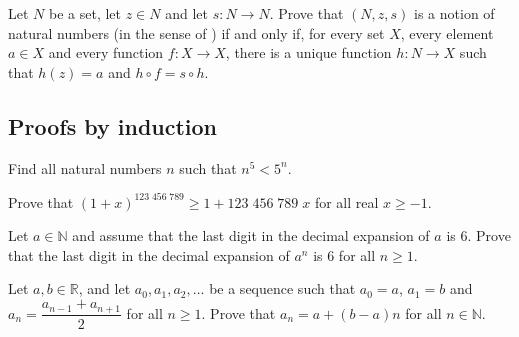 \begin{chapex}
Let $N$ be a set, let $z \in N$ and let $s : N \to N$. Prove that $(N, z, s)$ is a notion of natural numbers (in the sense of ) if and only if, for every set $X$, every element $a \in X$ and every function $f : X \to X$, there is a unique function $h : N \to X$ such that $h(z)=a$ and $h \circ f = s \circ h$.
\end{chapex}

\subsection*{Proofs by induction}

\begin{chapex}
\label{cqBernoullisInequality}
\label{cqNPowerFiveLessThanFivePowerN}
Find all natural numbers $n$ such that $n^5 < 5^n$.
\end{chapex}

\begin{chapex}
Prove that $(1+x)^{123\;456\;789} \ge 1 + 123\;456\;789\;x$ for all real $x \ge -1$.
\end{chapex}

\begin{chapex}
Let $a \in \mathbb{N}$ and assume that the last digit in the decimal expansion of $a$ is $6$. Prove that the last digit in the decimal expansion of $a^n$ is $6$ for all $n \ge 1$.
\end{chapex}

\begin{chapex}
Let $a,b \in \mathbb{R}$, and let $a_0, a_1, a_2, \dots$ be a sequence such that $a_0 = a$, $a_1=b$ and $a_n = \dfrac{a_{n-1} + a_{n+1}}{2}$ for all $n \ge 1$. Prove that $a_n = a + (b-a) n$ for all $n \in \mathbb{N}$.
\end{chapex}

